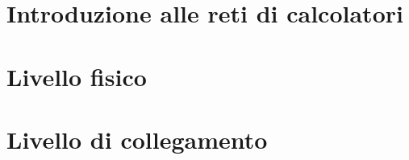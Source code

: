 \documentclass[10pt]{article}
\begin{document}
    \section{Introduzione alle reti di calcolatori}
    
    \clearpage

    \section{Livello fisico}
    
    \clearpage

    \section{Livello di collegamento}
    
    \clearpage
\end{document}
